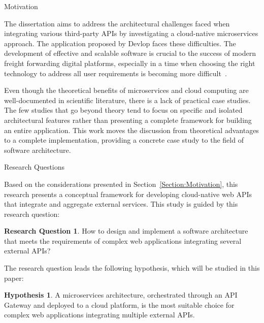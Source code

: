 \documentclass[12pt, reqno]{amsbook}
\makeatletter
\def\section{\@startsection{section}{1}%
      \z@{.5\linespacing\@plus.7\linespacing}{.25\linespacing}%
      {\normalfont\bfseries\flushleft}}
\theoremstyle{definition}
\theoremstyle{definition}
\newtheorem*{hypothesis}{Hypothesis}
\newtheorem*{research_question}{Research Question}
\numberwithin{section}{chapter}
\numberwithin{table}{chapter}
\numberwithin{figure}{chapter}
\makeatother
\begin{document}
\section{Motivation}
\label{Section:Motivation}

The dissertation aims to address the architectural challenges faced when integrating various third-party \acp{API} by investigating a cloud-native microservices approach. The application proposed by Devlop faces these difficulties. The development of effective and scalable software is crucial to the success of modern freight forwarding digital platforms, especially in a time when choosing the right technology to address all user requirements is becoming more difficult~\cite{Mushica2024}.

Even though the theoretical benefits of microservices and cloud computing are well-documented in scientific literature, there is a lack of practical case studies. The few studies that go beyond theory tend to focus on specific and isolated architectural features rather than presenting a complete framework for building an entire application. This work moves the discussion from theoretical advantages to a complete implementation, providing a concrete case study to the field of software architecture.

\section{Research Questions}
\label{Section:Research_Questions}

Based on the considerations presented in Section~\ref{Section:Motivation}, this research presents a conceptual framework for developing cloud-native web \acp{API} that integrate and aggregate external services. This study is guided by this research question:

\begin{research_question}
  How to design and implement a software architecture that meets the requirements of complex web applications integrating several external \acp{API}?
\end{research_question}

The research question leads the following hypothesis, which will be studied in this paper:

\begin{hypothesis}
  A microservices architecture, orchestrated through an \ac{API} Gateway and deployed to a cloud platform, is the most suitable choice for complex web applications integrating multiple external \acp{API}.
\end{hypothesis}
\end{document}
